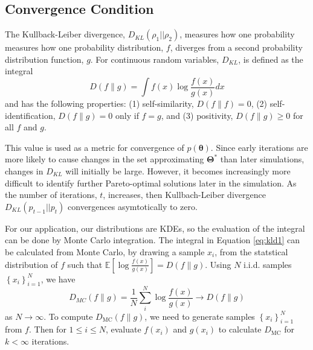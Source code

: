 
\subsection{Convergence Condition}
The Kullback-Leiber divergence\cite{kullback1951_kld}, $D_{KL}(\rho_1\vert\vert\rho_2)$, measures how one probability measures how one probability distribution, $f$, diverges from a second probability distribution function, $g$.  For continuous random variables, $D_{KL}$, is defined as the integral
\begin{equation}
\label{eq:kld1}
   D(f \parallel g) = \int f(x) \log \frac{f(x)}
                                          {g(x)} dx
\end{equation}
and has the following properties: (1) self-similarity, $D(f \parallel f) = 0$, (2) self-identification, $D(f \parallel g) = 0$ only if $f=g$, and (3) positivity, $D(f \parallel g) \geq 0$ for all $f$ and $g$.

This value is used as a metric for convergence of $p(\bm{\theta})$.
Since early iterations are more likely to cause changes in the set approximating $\bm{\Theta}^*$ than later simulations, changes in $D_{KL}$ will initially be large.  However, it becomes increasingly more difficult to identify further Pareto-optimal solutions later in the simulation.  As the number of iterations, $t$, increases, then Kullbach-Leiber divergence $D_{KL}(p_{t-1}\vert\vert p_t)$ convergences asymtotically to zero.


For our application, our distributions are KDEs, so the evaluation of the integral can be done by Monte Carlo integration.  The integral in Equation \ref{eq:kld1} can be calculated from Monte Carlo\cite{hershey2007_kld_approx}, by drawing a sample $x_i$, from the statstical distribution of $f$ such that $\mathbb{E}\left[\log\frac{f(x)}{g(x)}\right] = D(f \parallel g)$.  Using $N$ i.i.d. samples $\left\{x_i\right\}_{i=1}^N$, we have
\begin{equation}
  \label{eq:kdmc}
  D_{MC}(f \parallel g) = \frac{1}{N}\sum_i^N \log \frac{f(x)}{g(x)}
      \rightarrow D(f \parallel g)
\end{equation}
as $N \rightarrow \infty$.  To compute {$D_{\mathrm{MC}}(f \parallel g)$}, we need to generate samples $\left\{x_i\right\}_{i=1}^N$ from $f$.  Then for $1 \leq i \leq N$, evaluate $f(x_i)$ and $g(x_i)$ to calculate $D_{\mathrm{MC}}$
for $k < \infty$ iterations.

